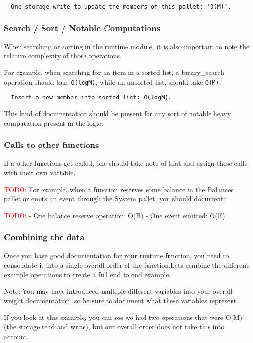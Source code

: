 \documentclass[11pt,a4paper]{article}
\newcommand{\todo}[1]{\textcolor{red}{TODO: #1}}
\begin{document}
\texttt{- One storage write to update the members of this pallet: `O(M)`.}

\subsubsection{Search / Sort / Notable Computations}
When searching or sorting in the runtime module, it is also important to note
the relative complexity of those operations.
\newline

For example, when searching for an item in a sorted list, a binary\_search
operation should take \texttt{O(logM)}, while an unsorted list, should take
\texttt{O(M)}.
\newline

\texttt{- Insert a new member into sorted list: O(logM).}
\newline

This kind of documentation should be present for any sort of notable heavy
computation present in the logic.

\subsubsection{Calls to other functions}

If a other functions get called, one should take note of that and assign these calls
with their own variable.
\newline

\todo{}
For example, when a function reserves some balance in the Balances pallet or emits
an event through the System pallet, you should document:
\newline

\todo{}
- One balance reserve operation: O(B)
- One event emitted: O(E)

\subsubsection{Combining the data}
Once you have good documentation for your runtime function, you need to consolidate
it into a single overall order of the function.Lets combine the different example
operations to create a full end to end example.

Note: You may have introduced multiple different variables into your overall
weight documentation, so be sure to document what these variables represent.

If you look at this example, you can see we had two operations that were O(M)
(the storage read and write), but our overall order does not take this into account.
\end{document}
